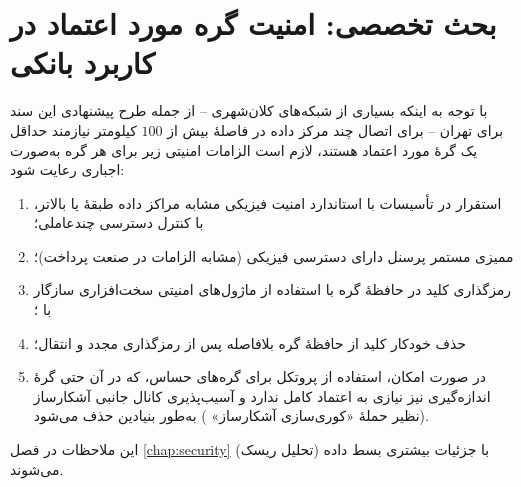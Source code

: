 \section{بحث تخصصی: امنیت گره مورد اعتماد در کاربرد بانکی}
\label{sec:bankingtrustednode}

با توجه به اینکه بسیاری از شبکه‌های  کلان‌شهری -- از جمله طرح پیشنهادی این سند برای تهران -- برای اتصال چند مرکز داده در فاصلهٔ بیش از $100$ کیلومتر نیازمند حداقل یک گرهٔ مورد اعتماد هستند، لازم است الزامات امنیتی زیر برای هر گره به‌صورت اجباری رعایت شود:

\begin{enumerate}
\item استقرار در تأسیسات با استاندارد امنیت فیزیکی مشابه مراکز داده طبقهٔ  یا بالاتر، با کنترل دسترسی چندعاملی؛
\item ممیزی مستمر پرسنل دارای دسترسی فیزیکی (مشابه الزامات  در صنعت پرداخت)؛
\item رمزگذاری کلید در حافظهٔ گره با استفاده از ماژول‌های امنیتی سخت‌افزاری  سازگار با ؛
\item حذف خودکار کلید از حافظهٔ گره بلافاصله پس از رمزگذاری مجدد و انتقال؛
\item در صورت امکان، استفاده از پروتکل  برای گره‌های حساس، که در آن حتی گرهٔ اندازه‌گیری نیز نیازی به اعتماد کامل ندارد و آسیب‌پذیری کانال جانبی آشکارساز (نظیر حملهٔ «کوری‌سازی آشکارساز» ) به‌طور بنیادین حذف می‌شود.
\end{enumerate}

این ملاحظات در فصل \ref{chap:security} (تحلیل ریسک) با جزئیات بیشتری بسط داده می‌شوند.

